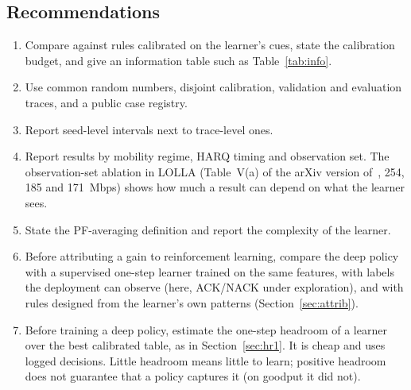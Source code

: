 \subsection{Recommendations}
\begin{enumerate}
\item Compare against rules calibrated on the learner's cues, state the calibration budget, and give an information table such as Table~\ref{tab:info}.
\item Use common random numbers, disjoint calibration, validation and evaluation traces, and a public case registry.
\item Report seed-level intervals next to trace-level ones.
\item Report results by mobility regime, HARQ timing and observation set. The observation-set ablation in LOLLA (Table~V(a) of the arXiv version of~\cite{wang2026lolla}, 254, 185 and 171~Mbps) shows how much a result can depend on what the learner sees.
\item State the PF-averaging definition and report the complexity of the learner.
\item Before attributing a gain to reinforcement learning, compare the deep policy with a supervised one-step learner trained on the same features, with labels the deployment can observe (here, ACK/NACK under exploration), and with rules designed from the learner's own patterns (Section~\ref{sec:attrib}).
\item Before training a deep policy, estimate the one-step headroom of a learner over the best calibrated table, as in Section~\ref{sec:hr1}. It is cheap and uses logged decisions. Little headroom means little to learn; positive headroom does not guarantee that a policy captures it (on goodput it did not).
\end{enumerate}

